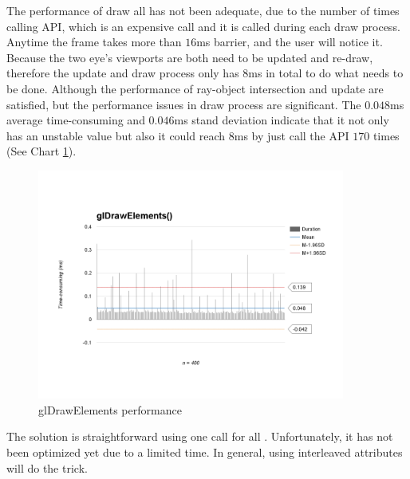 The performance of draw all  has not been adequate, due to the number of times calling  API, which is an expensive call and it is called during each  draw process. Anytime the frame takes more than $16$ms barrier, and the user will notice it. Because the two eye's viewports are both need to be updated and re-draw, therefore the update and draw process only has $8$ms in total to do what needs to be done. Although the performance of ray-object intersection and  update are satisfied, but the performance issues in draw process are significant. The $0.048$ms average time-consuming and $0.046$ms stand deviation indicate that it not only has an unstable value but also it could reach $8$ms by just call the API $170$ times (See Chart \ref{fig:glDrawElements-performance}).

\begin{figure}[H]
	\caption{glDrawElements performance}
	\label{fig:glDrawElements-performance}
	\centering
	\includegraphics[width=0.9\textwidth, keepaspectratio]{Figures/glDrawElements-performance.png}
	\decoRule
\end{figure}

The solution is straightforward using one  call for all . Unfortunately, it has not been optimized yet due to a limited time. In general, using interleaved attributes will do the trick.

